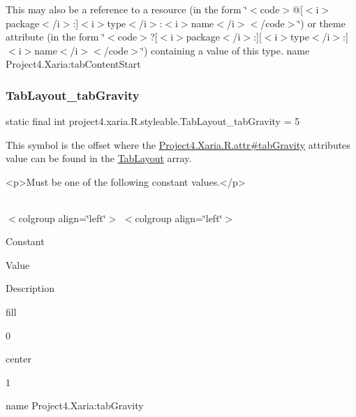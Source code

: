 This may also be a reference to a resource (in the form \char`\"{}$<$code$>$@\mbox{[}$<$i$>$package$<$/i$>$\+:\mbox{]}$<$i$>$type$<$/i$>$\+:$<$i$>$name$<$/i$>$$<$/code$>$\char`\"{}) or theme attribute (in the form \char`\"{}$<$code$>$?\mbox{[}$<$i$>$package$<$/i$>$\+:\mbox{]}\mbox{[}$<$i$>$type$<$/i$>$\+:\mbox{]}$<$i$>$name$<$/i$>$$<$/code$>$\char`\"{}) containing a value of this type.  name Project4.\+Xaria\+:tab\+Content\+Start \mbox{\label{classproject4_1_1xaria_1_1R_1_1styleable_a8c418d804b5e15d65312566231ca7340}} 
\subsubsection{\texorpdfstring{Tab\+Layout\+\_\+tab\+Gravity}{TabLayout\_tabGravity}}
{\footnotesize\ttfamily static final int project4.\+xaria.\+R.\+styleable.\+Tab\+Layout\+\_\+tab\+Gravity = 5\hspace{0.3cm}{\ttfamily [static]}}

This symbol is the offset where the \hyperlink{}{Project4.\+Xaria.\+R.\+attr\#tab\+Gravity} attribute\textquotesingle{}s value can be found in the \hyperlink{classproject4_1_1xaria_1_1R_1_1styleable_ab6bfb1f97ae9fba16f4f90d50871d4a8}{Tab\+Layout} array.

\begin{DoxyVerb}      <p>Must be one of the following constant values.</p>
\end{DoxyVerb}
 \tabulinesep=1mm
\begin{longtabu} spread 0pt [c]{*{0}{|X[-1]}|}
\hline
\end{longtabu}
$<$colgroup align=\char`\"{}left\char`\"{}$>$ $<$colgroup align=\char`\"{}left\char`\"{}$>$ 

Constant

Value

Description 

{\ttfamily fill}

0

{\ttfamily center}

1

name Project4.\+Xaria\+:tab\+Gravity \mbox{\label{classproject4_1_1xaria_1_1R_1_1styleable_a87c9501d7b9b1c4efdf9fd753a3b2a07}} 
